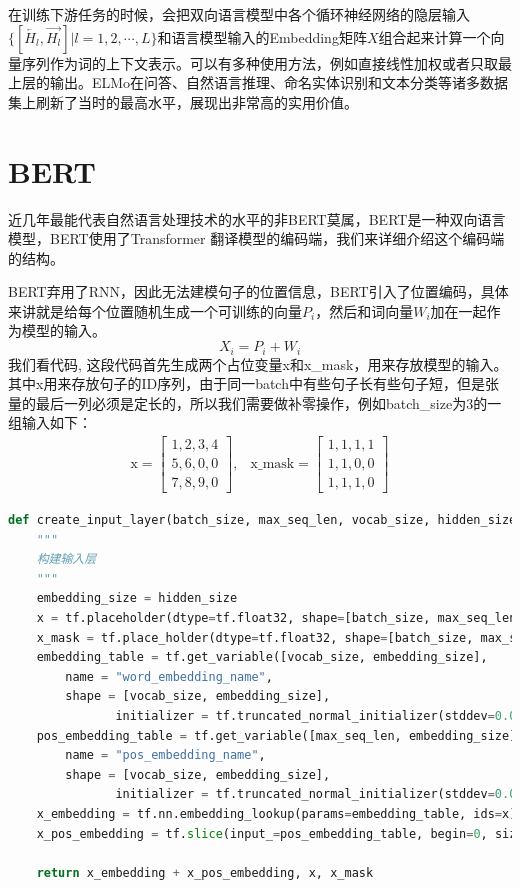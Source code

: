 \documentclass[twoside,a4paper,12pt]{book}%
\begin{document}
在训练下游任务的时候，会把双向语言模型中各个循环神经网络的隐层输入$\{[\overleftarrow{ H_{l}},\overrightarrow{ H_{l}}]|l=1,2,\cdots,L\}$和语言模型输入的Embedding矩阵$X$组合起来计算一个向量序列作为词的上下文表示。可以有多种使用方法，例如直接线性加权或者只取最上层的输出。ELMo在问答、自然语言推理、命名实体识别和文本分类等诸多数据集上刷新了当时的最高水平，展现出非常高的实用价值。

\section{BERT}
近几年最能代表自然语言处理技术的水平的非\gls{BERT}莫属，\gls{BERT}是一种双向语言模型，\gls{BERT}使用了Transformer 翻译模型的编码端，我们来详细介绍这个编码端的结构。

\gls{BERT}弃用了\gls{RNN}，因此无法建模句子的位置信息，\gls{BERT}引入了位置编码，具体来讲就是给每个位置随机生成一个可训练的向量$P_i$，然后和词向量$W_i$加在一起作为模型的输入。
$$
X_i = P_i + W_i
$$
我们看代码, 这段代码首先生成两个占位变量x和x\_mask，用来存放模型的输入。其中x用来存放句子的ID序列，由于同一batch中有些句子长有些句子短，但是张量的最后一列必须是定长的，所以我们需要做补零操作，例如batch\_size为3的一组输入如下：
$$
\begin{aligned}
\text{x} = \left [
\begin{matrix}
1,2,3,4 \\
5,6,0,0 \\
7,8,9,0
\end{matrix} \right ], &
\text{x\_mask} = \left [
\begin{matrix}
1,1,1,1 \\
1,1,0,0 \\
1,1,1,0
\end{matrix} \right ]
\end{aligned}
$$
\begin{lstlisting}[language={Python}]
def create_input_layer(batch_size, max_seq_len, vocab_size, hidden_size):
    """ 
    构建输入层 
    """
    embedding_size = hidden_size
    x = tf.placeholder(dtype=tf.float32, shape=[batch_size, max_seq_len])
    x_mask = tf.place_holder(dtype=tf.float32, shape=[batch_size, max_seq_len])
    embedding_table = tf.get_variable([vocab_size, embedding_size],
        name = "word_embedding_name",
        shape = [vocab_size, embedding_size],
               initializer = tf.truncated_normal_initializer(stddev=0.02))
    pos_embedding_table = tf.get_variable([max_seq_len, embedding_size],
        name = "pos_embedding_name",
        shape = [vocab_size, embedding_size],
               initializer = tf.truncated_normal_initializer(stddev=0.02))
    x_embedding = tf.nn.embedding_lookup(params=embedding_table, ids=x)
    x_pos_embedding = tf.slice(input_=pos_embedding_table, begin=0, size=max_seq_len)

    return x_embedding + x_pos_embedding, x, x_mask
\end{lstlisting}
\end{document}
